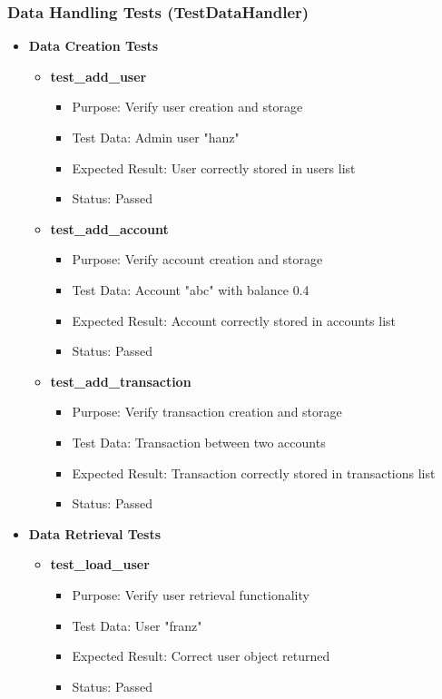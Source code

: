 \documentclass[a4paper,11pt]{article}
\begin{document}
\subsubsection{Data Handling Tests (TestDataHandler)}
\begin{itemize}
\item \textbf{Data Creation Tests}
  \begin{itemize}
  \item \textbf{test\_add\_user}
    \begin{itemize}
    \item Purpose: Verify user creation and storage
    \item Test Data: Admin user "hanz"
    \item Expected Result: User correctly stored in users list
    \item Status: Passed
    \end{itemize}

  \item \textbf{test\_add\_account}
    \begin{itemize}
    \item Purpose: Verify account creation and storage
    \item Test Data: Account "abc" with balance 0.4
    \item Expected Result: Account correctly stored in accounts list
    \item Status: Passed
    \end{itemize}

  \item \textbf{test\_add\_transaction}
    \begin{itemize}
    \item Purpose: Verify transaction creation and storage
    \item Test Data: Transaction between two accounts
    \item Expected Result: Transaction correctly stored in transactions list
    \item Status: Passed
    \end{itemize}
  \end{itemize}

\item \textbf{Data Retrieval Tests}
  \begin{itemize}
  \item \textbf{test\_load\_user}
    \begin{itemize}
    \item Purpose: Verify user retrieval functionality
    \item Test Data: User "franz"
    \item Expected Result: Correct user object returned
    \item Status: Passed
    \end{itemize}


\end{itemize}
\end{itemize}
\end{document}
